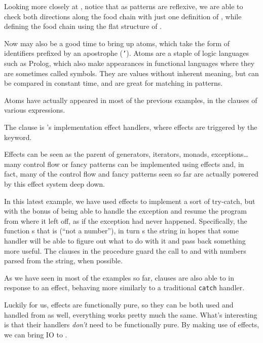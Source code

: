 
Looking more closely at \Law{}, notice that as patterns are reflexive, we are
able to check both directions along the food chain with just one definition of
, while defining the food chain using the flat structure of .

Now may also be a good time to bring up atoms, which take the form of identifiers
prefixed by an apostrophe (\texttt{'}). Atoms are a staple of logic languages
such as Prolog, which also make appearances in functional languages where
they are sometimes called symbols. They are values without inherent meaning,
but can be compared in constant time, and are great for matching in patterns.

Atoms have actually appeared in most of the previous examples, in the 
clauses of various expressions.


The  clause is \Trilogy{}'s implementation effect handlers, where
effects are triggered by the  keyword.

Effects can be seen as the parent of generators, iterators, monads,
exceptions\dots many control flow or fancy patterns can be implemented using
effects and, in fact, many of the control flow and fancy patterns seen so far
are actually powered by this effect system deep down.

In this latest example, we have used effects to implement a sort of try-catch,
but with the bonus of being able to handle the exception and resume the program
from where it left off, as if the exception had never happened. Specifically,
 the  function s that  is 
(``not a number''),  in turn s the string in hopes that
some handler will be able to figure out what to do with it and pass back something
more useful. The  clauses in the  procedure guard the call to
 and  with numbers parsed from the string, when possible.

As we have seen in most of the examples so far,  clauses are also able
to  in response to an effect, behaving more similarly to a traditional
\texttt{catch} handler.


Luckily for us, effects are functionally pure, so they can be both used and
handled from \Poetry{} as well, everything works pretty much the same. What's
interesting is that their handlers \emph{don't} need to be functionally pure.
By making use of effects, we can bring IO to \Poetry{}.

